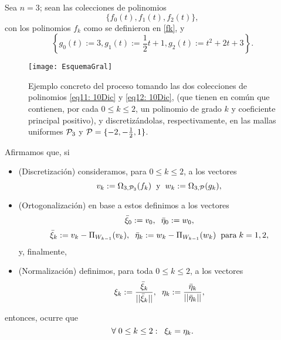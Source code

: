 \begin{ej}
Sea $n=3$; sean las colecciones de polinomios
\begin{equation}
\label{eq11: 10Dic}
\{
f_{0}(t), 
f_{1}(t), f_{2}(t) \},
\end{equation}
con los polinomios $f_{k}$ como se definieron en \eqref{fk}, y
\begin{equation}
\label{eq12: 10Dic}
\left\{
g_{0}(t):=3,  
g_{1}(t):=\frac{1}{2}t+1,
g_{2}(t):=t^{2}+2t+3 \right\}.
\end{equation}



\begin{figure}[H]
\centering\captionsetup{format = hang}
	\begin{measuredfigure}
		\texttt{[image: EsquemaGral]} 
		\caption{Ejemplo concreto del proceso tomando 
		las dos colecciones
    de polinomios \eqref{eq11: 10Dic} y \eqref{eq12: 10Dic},
    (que tienen en común que contienen, por cada $0 \leq k \leq 2$,
    un polinomio de grado $k$ y coeficiente principal positivo), y
    discretizándolas, respectivamente, en las mallas uniformes 
    $\mathcal{P}_{3}$ y $\mathcal{P} =\{-2, -\frac{1}{2}, 1 \}$.}
 	\end{measuredfigure}
 \end{figure}


Afirmamos que, si
\begin{itemize}
\item \textcolor{ameMorado}{{(Discretización)}}
consideramos, para $0 \leq k \leq 2$, a los vectores
\[
v_{k}:= \Omega_{3, \mathcal{P}_{3}}(f_{k})
\hspace{0.2cm} \text{y} \hspace{0.2cm}
w_{k}:= \Omega_{3, \mathcal{P}}(g_{k}),
\]
\item \textcolor{ameMorado}{{(Ortogonalización)}}
en base a estos definimos a los vectores
$$ \bar{\xi}_{0}:= v_{0}, 
\hspace{0.2cm} \bar{\eta}_{0}:= w_{0}, 
$$
$$ \bar{\xi}_{k}:= v_{k} - \Pi_{W_{k-1}}(v_{k}), \hspace{0.2cm}
\bar{\eta}_{k}:= w_{k} - \Pi_{W_{k-1}}(w_{k})
\hspace{0.2cm} \text{para} 
\hspace{0.1cm}
k=1,2, $$ y, finalmente, 
\item \textcolor{ameMorado}{{(Normalización)}}
definimos, para toda $0 \leq k \leq 2$,
a los vectores
$$\xi_{k}:= \frac{\bar{\xi}_{k}}{|| \bar{\xi}_{k} ||},
\hspace{0.2cm}
\eta_{k}:= \frac{\bar{\eta}_{k}}{|| \bar{\eta}_{k} ||},
$$
\end{itemize}
entonces, ocurre que
\[
\forall \hspace{0.1cm} 0 \leq k \leq 2:
\hspace{0.2cm} \xi_{k}= \eta_{k}.
\]
\final
\end{ej}



